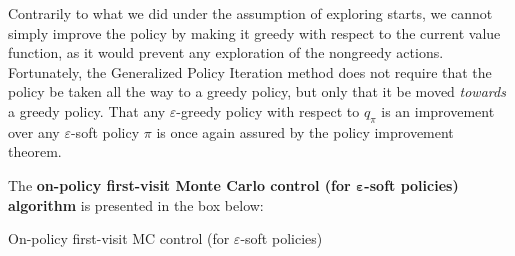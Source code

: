 Contrarily to what we did under the assumption of exploring starts, we cannot simply improve the policy by making it greedy with respect to the current value function, as it would prevent any exploration of the nongreedy actions. Fortunately, the Generalized Policy Iteration method does not require that the policy be taken all the way to a greedy policy, but only that it be moved \textit{towards} a greedy policy. That any $\varepsilon$-greedy policy with respect to $q_\pi$ is an improvement over any $\varepsilon$-soft policy $\pi$ is once again assured by the policy improvement theorem.

The \textbf{on-policy first-visit Monte Carlo control (for $\boldsymbol{\varepsilon}$-soft policies) algorithm} is presented in the box below:

\begin{algorithm}[H]
\SetAlgoLined
{}

 \caption{On-policy first-visit MC control (for $\varepsilon$-soft policies)}
\end{algorithm}